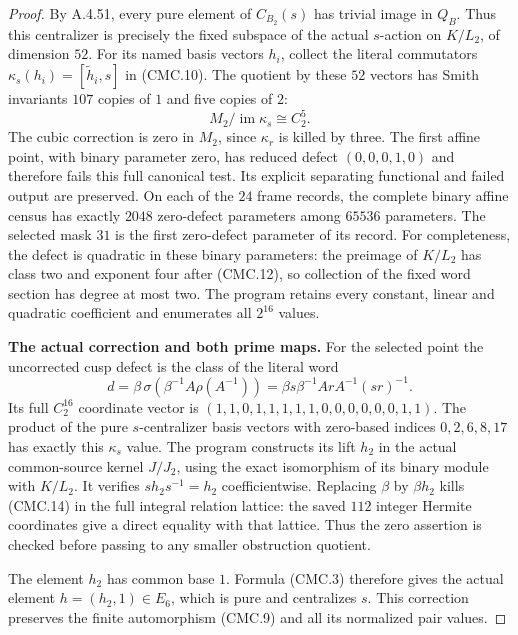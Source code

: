 \begin{proof}
By A.4.51, every pure element of $C_{B_2}(s)$ has trivial image in $Q_B$.
Thus this centralizer is precisely the fixed subspace of the actual
$s$-action on $K/L_2$, of dimension $52$.  For its named basis vectors
$h_i$, collect the literal commutators
$\kappa_s(h_i)=[\widetilde h_i,s]$ in (CMC.10).  The quotient by these
$52$ vectors has Smith invariants $107$ copies of $1$ and five copies
of $2$:
\[
 M_2/\operatorname{im}\kappa_s\cong C_2^5.
 \tag{CMC.13}
\]
The cubic correction is zero in $M_2$, since $\kappa_r$ is killed by
three.  The first affine point, with binary parameter zero, has reduced
defect $(0,0,0,1,0)$ and therefore fails this full canonical test.
Its explicit separating functional and failed output are preserved.
On each of the $24$ frame records, the complete binary affine census
has exactly $2048$ zero-defect parameters among $65536$ parameters.
The selected mask $31$ is the first zero-defect parameter of its record.
For completeness, the defect is quadratic in these binary parameters:
the preimage of $K/L_2$ has class two and exponent four after (CMC.12),
so collection of the fixed word section has degree at most two.
The program retains every constant, linear and quadratic coefficient
and enumerates all $2^{16}$ values.

\par\medskip\noindent\textbf{The actual correction and both prime maps.}
For the selected point the uncorrected cusp defect is the class of the
literal word
\[
 d=\beta\,\sigma\!\left(\beta^{-1}A\rho(A^{-1})\right)
   =\beta s\beta^{-1}ArA^{-1}(sr)^{-1}.
 \tag{CMC.14}
\]
Its full $C_2^{16}$ coordinate vector is
$(1,1,0,1,1,1,1,1,0,0,0,0,0,0,1,1)$.
The product of the pure $s$-centralizer basis vectors with zero-based
indices $0,2,6,8,17$ has exactly this $\kappa_s$ value.  The program
 constructs its lift
$h_2$ in the actual common-source kernel $J/J_2$, using the exact
isomorphism of its binary module with $K/L_2$.  It verifies
$s h_2s^{-1}=h_2$ coefficientwise.  Replacing $\beta$ by $\beta h_2$
kills (CMC.14) in the full integral relation lattice: the saved
$112$ integer Hermite coordinates give a direct equality with that
lattice.  Thus the zero assertion is checked before passing to any
smaller obstruction quotient.

The element $h_2$ has common base $1$.  Formula (CMC.3) therefore gives
the actual element $h=(h_2,1)\in E_6$, which is pure and centralizes $s$.
This correction preserves the finite automorphism (CMC.9) and all its
normalized pair values.


\end{proof}
